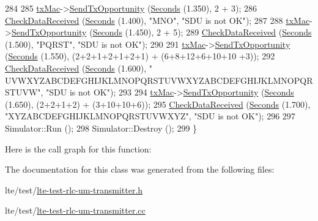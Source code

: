\begin{DoxyCode}
284 
285   \hyperlink{classLteRlcUmTransmitterTestCase_a9cd57d7805fdc18d579e28045b50436c}{txMac}->\hyperlink{classns3_1_1LteTestMac_a3af5da64ba337869f4082118194f6641}{SendTxOpportunity} (\hyperlink{group__timecivil_ga33c34b816f8ff6628e33d5c8e9713b9e}{Seconds} (1.350), 2 + 3);
286   \hyperlink{classLteRlcUmTransmitterTestCase_a49a8eddf5f0cd36ceab21333be21de7b}{CheckDataReceived} (\hyperlink{group__timecivil_ga33c34b816f8ff6628e33d5c8e9713b9e}{Seconds} (1.400), \textcolor{stringliteral}{"MNO"}, \textcolor{stringliteral}{"SDU is not OK"});
287 
288   \hyperlink{classLteRlcUmTransmitterTestCase_a9cd57d7805fdc18d579e28045b50436c}{txMac}->\hyperlink{classns3_1_1LteTestMac_a3af5da64ba337869f4082118194f6641}{SendTxOpportunity} (\hyperlink{group__timecivil_ga33c34b816f8ff6628e33d5c8e9713b9e}{Seconds} (1.450), 2 + 5);
289   \hyperlink{classLteRlcUmTransmitterTestCase_a49a8eddf5f0cd36ceab21333be21de7b}{CheckDataReceived} (\hyperlink{group__timecivil_ga33c34b816f8ff6628e33d5c8e9713b9e}{Seconds} (1.500), \textcolor{stringliteral}{"PQRST"}, \textcolor{stringliteral}{"SDU is not OK"});
290 
291   \hyperlink{classLteRlcUmTransmitterTestCase_a9cd57d7805fdc18d579e28045b50436c}{txMac}->\hyperlink{classns3_1_1LteTestMac_a3af5da64ba337869f4082118194f6641}{SendTxOpportunity} (\hyperlink{group__timecivil_ga33c34b816f8ff6628e33d5c8e9713b9e}{Seconds} (1.550), (2+2+1+2+1+2+1) + (6+8+12+6+10+10
      +3));
292   \hyperlink{classLteRlcUmTransmitterTestCase_a49a8eddf5f0cd36ceab21333be21de7b}{CheckDataReceived} (\hyperlink{group__timecivil_ga33c34b816f8ff6628e33d5c8e9713b9e}{Seconds} (1.600), \textcolor{stringliteral}{"
      UVWXYZABCDEFGHIJKLMNOPQRSTUVWXYZABCDEFGHIJKLMNOPQRSTUVW"}, \textcolor{stringliteral}{"SDU is not OK"});
293 
294   \hyperlink{classLteRlcUmTransmitterTestCase_a9cd57d7805fdc18d579e28045b50436c}{txMac}->\hyperlink{classns3_1_1LteTestMac_a3af5da64ba337869f4082118194f6641}{SendTxOpportunity} (\hyperlink{group__timecivil_ga33c34b816f8ff6628e33d5c8e9713b9e}{Seconds} (1.650), (2+2+1+2) + (3+10+10+6));
295   \hyperlink{classLteRlcUmTransmitterTestCase_a49a8eddf5f0cd36ceab21333be21de7b}{CheckDataReceived} (\hyperlink{group__timecivil_ga33c34b816f8ff6628e33d5c8e9713b9e}{Seconds} (1.700), \textcolor{stringliteral}{"XYZABCDEFGHIJKLMNOPQRSTUVWXYZ"}, \textcolor{stringliteral}{"SDU is not
       OK"});
296 
297   Simulator::Run ();
298   Simulator::Destroy ();
299 \}
\end{DoxyCode}


Here is the call graph for this function\+:




The documentation for this class was generated from the following files\+:\begin{DoxyCompactItemize}
\item 
lte/test/\hyperlink{lte-test-rlc-um-transmitter_8h}{lte-\/test-\/rlc-\/um-\/transmitter.\+h}\item 
lte/test/\hyperlink{lte-test-rlc-um-transmitter_8cc}{lte-\/test-\/rlc-\/um-\/transmitter.\+cc}\end{DoxyCompactItemize}
